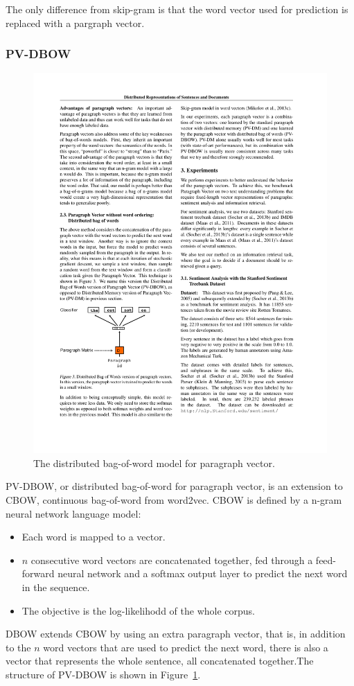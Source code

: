 The only difference from skip-gram is that the word vector used for prediction is replaced with a pargraph vector.

\subsubsection{PV-DBOW}

\begin{figure}
\centering
\includegraphics[width=0.5\columnwidth]{figures/methods/PV-DBOW}
\caption{The distributed bag-of-word model for paragraph vector.}
\label{fig:methods:PV-DBOW}
\end{figure}

PV-DBOW, or distributed bag-of-word for paragraph vector, is an extension to CBOW, continuous bag-of-word from word2vec. CBOW is defined by a n-gram neural network language model:

\begin{itemize}
    \item Each word is mapped to a vector.
    \item $n$ consecutive word vectors are concatenated together, fed through a feed-forward neural network and a softmax output layer to predict the next word in the sequence.
    \item The objective is the log-likelihodd of the whole corpus.
\end{itemize}

DBOW extends CBOW by using an extra paragraph vector, that is, in addition to the $n$ word vectors that are used to predict the next word, there is also a vector that represents the whole sentence, all concatenated together.The structure of PV-DBOW is shown in Figure~\ref{fig:methods:PV-DBOW}.

